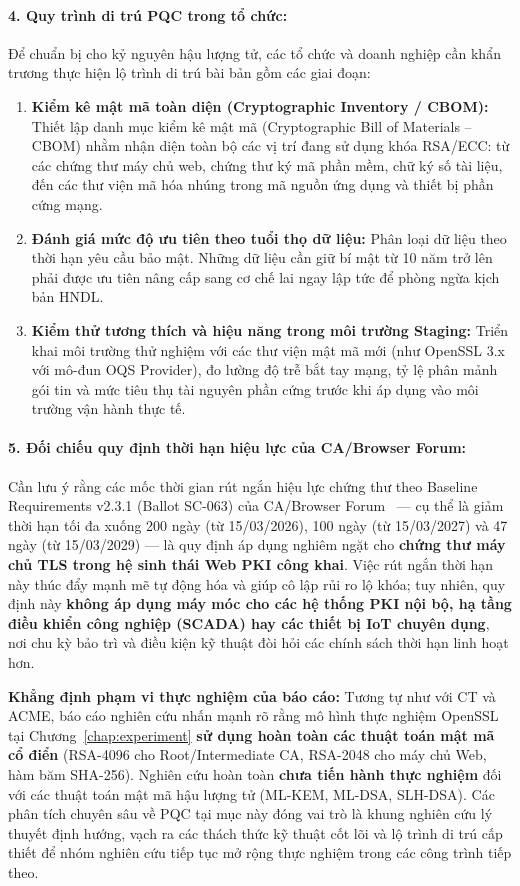 \paragraph{4. Quy trình di trú PQC trong tổ chức:}
Để chuẩn bị cho kỷ nguyên hậu lượng tử, các tổ chức và doanh nghiệp cần khẩn trương thực hiện lộ trình di trú bài bản gồm các giai đoạn:
\begin{enumerate}
    \item \textbf{Kiểm kê mật mã toàn diện (Cryptographic Inventory / CBOM):} Thiết lập danh mục kiểm kê mật mã (Cryptographic Bill of Materials -- CBOM) nhằm nhận diện toàn bộ các vị trí đang sử dụng khóa RSA/ECC: từ các chứng thư máy chủ web, chứng thư ký mã phần mềm, chữ ký số tài liệu, đến các thư viện mã hóa nhúng trong mã nguồn ứng dụng và thiết bị phần cứng mạng.
    \item \textbf{Đánh giá mức độ ưu tiên theo tuổi thọ dữ liệu:} Phân loại dữ liệu theo thời hạn yêu cầu bảo mật. Những dữ liệu cần giữ bí mật từ 10 năm trở lên phải được ưu tiên nâng cấp sang cơ chế lai ngay lập tức để phòng ngừa kịch bản HNDL.
    \item \textbf{Kiểm thử tương thích và hiệu năng trong môi trường Staging:} Triển khai môi trường thử nghiệm với các thư viện mật mã mới (như OpenSSL 3.x với mô-đun OQS Provider), đo lường độ trễ bắt tay mạng, tỷ lệ phân mảnh gói tin và mức tiêu thụ tài nguyên phần cứng trước khi áp dụng vào môi trường vận hành thực tế.
\end{enumerate}

\paragraph{5. Đối chiếu quy định thời hạn hiệu lực của CA/Browser Forum:}
Cần lưu ý rằng các mốc thời gian rút ngắn hiệu lực chứng thư theo Baseline Requirements v2.3.1 (Ballot SC-063) của CA/Browser Forum~\cite{cabforum_br} --- cụ thể là giảm thời hạn tối đa xuống 200 ngày (từ 15/03/2026), 100 ngày (từ 15/03/2027) và 47 ngày (từ 15/03/2029) --- là quy định áp dụng nghiêm ngặt cho \textbf{chứng thư máy chủ TLS trong hệ sinh thái Web PKI công khai}. Việc rút ngắn thời hạn này thúc đẩy mạnh mẽ tự động hóa và giúp cô lập rủi ro lộ khóa; tuy nhiên, quy định này \textbf{không áp dụng máy móc cho các hệ thống PKI nội bộ, hạ tầng điều khiển công nghiệp (SCADA) hay các thiết bị IoT chuyên dụng}, nơi chu kỳ bảo trì và điều kiện kỹ thuật đòi hỏi các chính sách thời hạn linh hoạt hơn.

\noindent\textbf{Khẳng định phạm vi thực nghiệm của báo cáo:} Tương tự như với CT và ACME, báo cáo nghiên cứu nhấn mạnh rõ rằng mô hình thực nghiệm OpenSSL tại Chương~\ref{chap:experiment} \textbf{sử dụng hoàn toàn các thuật toán mật mã cổ điển} (RSA-4096 cho Root/Intermediate CA, RSA-2048 cho máy chủ Web, hàm băm SHA-256). Nghiên cứu hoàn toàn \textbf{chưa tiến hành thực nghiệm} đối với các thuật toán mật mã hậu lượng tử (ML-KEM, ML-DSA, SLH-DSA). Các phân tích chuyên sâu về PQC tại mục này đóng vai trò là khung nghiên cứu lý thuyết định hướng, vạch ra các thách thức kỹ thuật cốt lõi và lộ trình di trú cấp thiết để nhóm nghiên cứu tiếp tục mở rộng thực nghiệm trong các công trình tiếp theo.
